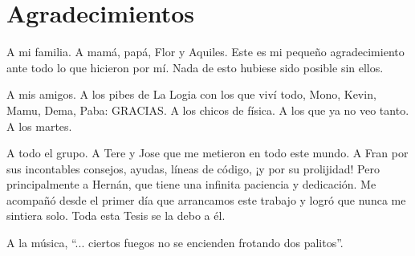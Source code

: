 \chapter*{Agradecimientos}


A mi familia. A mamá, papá, Flor y Aquiles. Este es mi pequeño agradecimiento ante todo lo que hicieron por mí. Nada de esto hubiese sido posible sin ellos.

A mis amigos. A los pibes de La Logia con los que viví todo, Mono, Kevin, Mamu, Dema, Paba: GRACIAS. A los chicos de física. A los que ya no veo tanto. A los martes.

A todo el grupo. A Tere y Jose que me metieron en todo este mundo. A Fran por sus incontables consejos, ayudas, líneas de código, ¡y por su prolijidad! Pero principalmente a Hernán, que tiene una infinita paciencia y dedicación. Me acompañó desde el primer día que arrancamos este trabajo y logró que nunca me sintiera solo. Toda esta Tesis se la debo a él.

A la música, “... ciertos fuegos no se encienden frotando dos palitos”.

\clearpage
